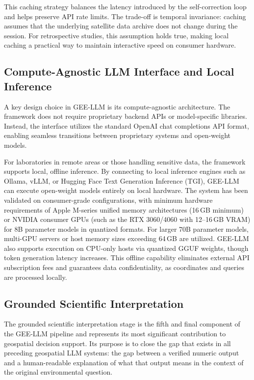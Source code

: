 \documentclass[pdflatex,sn-mathphys-ay]{sn-jnl}
\begin{document}
This caching strategy balances the latency introduced by the self-correction loop and helps preserve API rate limits. The trade-off is temporal invariance: caching assumes that the underlying satellite data archive does not change during the session. For retrospective studies, this assumption holds true, making local caching a practical way to maintain interactive speed on consumer hardware.

\subsection{Compute-Agnostic LLM Interface and Local Inference}\label{sec:arch_interface}
A key design choice in GEE-LLM is its compute-agnostic architecture. The framework does not require proprietary backend APIs or model-specific libraries. Instead, the interface utilizes the standard OpenAI chat completions API format, enabling seamless transitions between proprietary systems and open-weight models. 

For laboratories in remote areas or those handling sensitive data, the framework supports local, offline inference. By connecting to local inference engines such as Ollama, vLLM, or Hugging Face Text Generation Inference (TGI), GEE-LLM can execute open-weight models entirely on local hardware. The system has been validated on consumer-grade configurations, with minimum hardware requirements of Apple M-series unified memory architectures (16\,GB minimum) or NVIDIA consumer GPUs (such as the RTX 3060/4060 with 12--16\,GB VRAM) for 8B parameter models in quantized formats. For larger 70B parameter models, multi-GPU servers or host memory sizes exceeding 64\,GB are utilized. GEE-LLM also supports execution on CPU-only hosts via quantized GGUF weights, though token generation latency increases. This offline capability eliminates external API subscription fees and guarantees data confidentiality, as coordinates and queries are processed locally.

\subsection{Grounded Scientific Interpretation}\label{sec:arch_interpret}

The grounded scientific interpretation stage is the fifth and final component of the GEE-LLM pipeline and represents its most significant contribution to geospatial decision support. Its purpose is to close the gap that exists in all preceding geospatial LLM systems: the gap between a verified numeric output and a human-readable explanation of what that output means in the context of the original environmental question.
\end{document}
